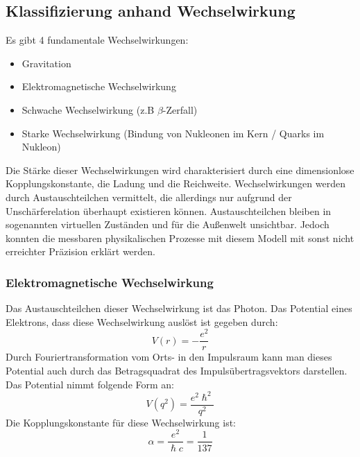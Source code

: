 \documentclass[Ex4_Zusammenfassung.tex]{subfiles}
\begin{document}
\subsection{Klassifizierung anhand Wechselwirkung}
Es gibt 4 fundamentale Wechselwirkungen:
\begin{itemize}
\item Gravitation
\item Elektromagnetische Wechselwirkung
\item Schwache Wechselwirkung (z.B $\beta$-Zerfall)
\item Starke Wechselwirkung (Bindung von Nukleonen im Kern / Quarks im Nukleon)
\end{itemize}
Die Stärke dieser Wechselwirkungen wird charakterisiert durch eine dimensionlose Kopplungskonstante, die Ladung und die Reichweite.
Wechselwirkungen werden durch Austauschteilchen vermittelt, die allerdings nur aufgrund der Unschärferelation überhaupt existieren können. \newline
Austauschteilchen bleiben in sogenannten virtuellen Zuständen und für die Außenwelt unsichtbar. Jedoch konnten die messbaren physikalischen Prozesse mit diesem Modell mit sonst nicht erreichter Präzision erklärt werden. 
\subsubsection{Elektromagnetische Wechselwirkung}
Das Austauschteilchen dieser Wechselwirkung ist das Photon.
Das Potential eines Elektrons, dass diese Wechselwirkung auslöst ist gegeben durch:
\begin{equation}
V(r) = -  \frac{e^2}{r}
\end{equation}
Durch Fouriertransformation vom Orts- in den Impulsraum kann man dieses Potential auch durch das Betragsquadrat des Impulsübertragsvektors darstellen. Das Potential nimmt folgende Form an: 
\begin{equation}
V(q^2) = \frac{e^2 \hslash^2}{q^2}
\end{equation}
Die Kopplungskonstante für diese Wechselwirkung ist: 
\begin{equation}
\alpha = \frac{e^2}{\hslash c} = \frac{1}{137}
\end{equation} \newpage 
\end{document}

